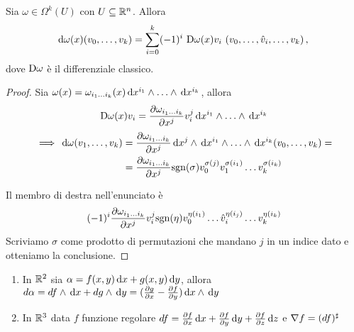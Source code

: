 \begin{corollary}
	Sia $\omega \in \Omega^k(U)$ con $U\subseteq \mathbb R^n$. Allora
	\begin{equation*}
		\,\mathrm d \omega (x) (v_0,\ldots,v_k) = \sum_{i=0}^k (-1)^i\ \mathrm D \omega (x) v_i\ (v_0,\ldots,\hat v_i, \ldots, v_k)\, \text{, }
	\end{equation*}
	dove $\mathrm D \omega$ è il differenziale classico.
\end{corollary}
\begin{proof}
	Sia $\omega(x) = \omega_{i_1 \dots  i_k} (x) \,\mathrm d x^{i_1}\wedge\ldots\wedge \,\mathrm d x^{i_k}$, allora
	\begin{equation*}
		\mathrm D \omega(x) v_i = \frac{\partial \omega_{i_1 \dots  i_k}}{\partial x^j} v_i^j \,\mathrm d x^{i_1}\wedge\ldots\wedge \,\mathrm d x^{i_k}
	\end{equation*}
	\begin{align*}
		\implies \de \omega (\seqb vk,) &= \DerParz{\omega_{\seqb ik{}}}{x^j} \de x^j \wedge \de x^{i_1}\wedge\ldots\wedge \de x^{i_k} (v_0,\ldots,v_k)= \\
		&=\DerParz{\omega_{\seqb ik{}}}{x^j} \sgn(\sigma) v_0^{\sigma(j)} v_1^{\sigma(i_1)} \ldots v_k^{\sigma(i_k)} %
	\end{align*}
	
	Il membro di destra nell'enunciato è
	\begin{equation*}
		(-1)^i \frac{\partial \omega_{i_1 \dots  i_k}}{\partial x^j} v_i^j \mathrm{sgn}(\eta) v_0^{\eta(i_1)} \ldots \hat v_i^{\eta(i_j)} \ldots v_k^{\eta(i_k)}
	\end{equation*}
	Scriviamo $\sigma$ come prodotto di permutazioni che mandano $j$ in un indice dato e otteniamo la conclusione.
\end{proof}

\begin{example}
	\begin{enumerate}
	 \item In $\mathbb R^2$ sia $\alpha = f(x,y) \,\mathrm d x + g(x,y) \,\mathrm d y$, allora $d \alpha= d f\wedge \,\mathrm d x + d g \wedge \,\mathrm d y = (\frac{\partial g}{\partial x} - \frac{\partial f}{\partial y}) \,\mathrm d x\wedge \,\mathrm d y $
	 \item In $\mathbb R^3$ data $f$ funzione regolare $d f = \frac{\partial f}{\partial x} \,\mathrm d x + \frac{\partial f}{\partial y} \,\mathrm d y + \frac{\partial f}{\partial z} \,\mathrm d z$ e $\nabla f = (df)^\sharp$
	\end{enumerate}
\end{example}

